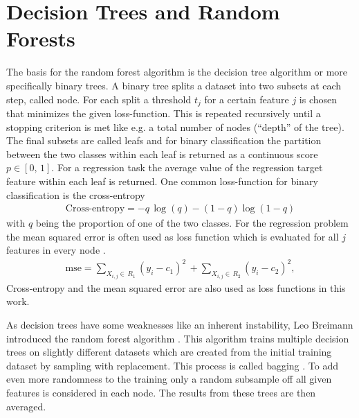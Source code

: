 \section{Decision Trees and Random Forests}
The basis for the random forest algorithm is the decision tree algorithm \cite{breiman1984classification} or more specifically binary trees.
A binary tree splits a dataset into two subsets at each step, called node.
For each split a threshold $t_j$ for a certain feature $j$ is chosen that minimizes the given loss-function.
This is repeated recursively until a stopping criterion is met like e.g. a total number of nodes (\enquote{depth} of the tree). 
The final subsets are called leafs and for binary classification the partition between the two classes within each leaf is returned as a continuous score $p \in [0,\, 1]$.
For a regression task the average value of the regression target feature within each leaf is returned.
One common loss-function for binary classification is the cross-entropy
\begin{align}
    \text{Cross-entropy} = - q\, \log(q) - (1 - q) \log(1 - q)
\end{align}
with $q$ being the proportion of one of the two classes.
For the regression problem the mean squared error is often used as loss function which is evaluated for all $j$ features in every node \cite{hastie2009elements}.
\begin{align}
    \text{mse} = \sum_{X_{i,j} \in\, R_1} (y_i - c_1)^2\, + \sum_{X_{i,j} \in\, R_2} (y_i - c_2)^2,
\end{align}
Cross-entropy and the mean squared error are also used as loss functions in this work.

As decision trees have some weaknesses like an inherent instability, Leo Breimann introduced the random forest algorithm \cite{breiman2001random}. 
This algorithm trains multiple decision trees on slightly different datasets which are created from the initial training dataset by sampling with replacement.
This process is called bagging \cite{breiman1996bagging}.
To add even more randomness to the training only a random subsample off all given features is considered in each node. 
The results from these trees are then averaged.


